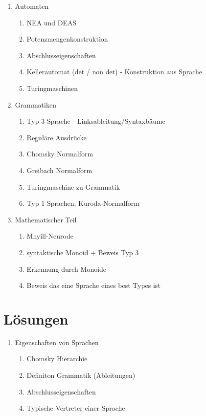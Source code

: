 \documentclass[12pt]{scrartcl}
\begin{document}
\begin{enumerate}
	\item Automaten
		\begin{enumerate}
			\item NEA und DEAS
			\item Potenzmengenkonstruktion
			\item Abschlusseigenschaften
			\item Kellerautomat (det / non det) - Konstruktion aus Sprache 
			\item Turingmaschinen 
		\end{enumerate}
		
	\item Grammatiken
		\begin{enumerate}
			\item Typ 3 Sprache - Linksableitung/Syntaxbäume
			\item Reguläre Ausdrücke
			\item Chomsky Normalform
			\item Greibach Normalform
			\item Turingmaschine zu Grammatik
			\item Typ 1 Sprachen, Kuroda-Normalform
		\end{enumerate}
		
		\item Mathematischer Teil
		\begin{enumerate}
			\item Mhyill-Neurode
			\item syntaktische Monoid + Beweis Typ 3
			\item Erkennung durch  Monoide 
			\item Beweis das eine Sprache eines best Types ist 
		\end{enumerate}
\end{enumerate}

\newpage

\section{Lösungen}
	\begin{enumerate}
	
	\item Eigenschaften von Sprachen
		\begin{enumerate}
			\item Chomsky Hierarchie
				
			\item Definiton Grammatik (Ableitungen) 
			\item Abschlusseigenschaften
			\item Typische Vertreter einer Sprache
		\end{enumerate}
		
\end{enumerate}
\end{document}
